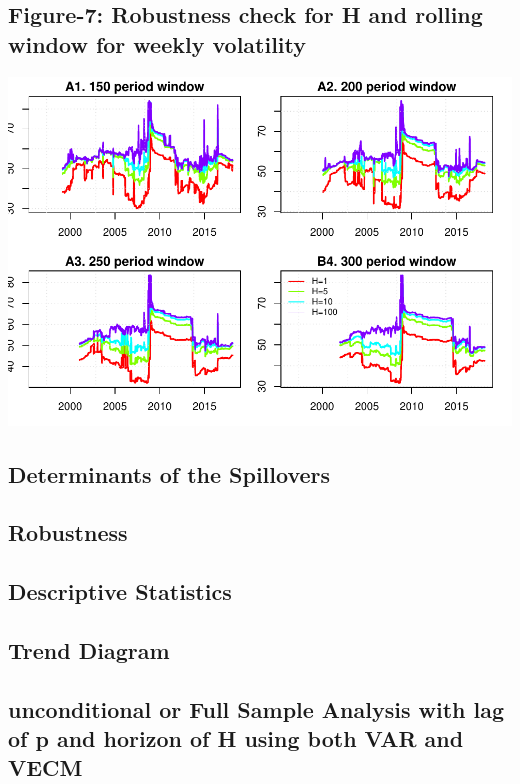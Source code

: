 \documentclass[]{elsarticle} %
\makeatletter
\def\maxwidth{\ifdim\Gin@nat@width>\linewidth\linewidth
\else\Gin@nat@width\fi}
\let\Oldincludegraphics\includegraphics
\renewcommand{\includegraphics}[1]{\Oldincludegraphics[width=\maxwidth]{#1}}
\makeatother
\begin{document}
\subsection{\texorpdfstring{\textbf{Figure-7: Robustness check for H and
rolling window for weekly
volatility}}{Figure-7: Robustness check for H and rolling window for weekly volatility}}\label{figure-7-robustness-check-for-h-and-rolling-window-for-weekly-volatility}

\includegraphics{Main_files/figure-latex/unnamed-chunk-11-1.pdf}

\subsection{Determinants of the
Spillovers}\label{determinants-of-the-spillovers}

\subsection{Robustness}\label{robustness}

\subsection{Descriptive Statistics}\label{descriptive-statistics}

\subsection{Trend Diagram}\label{trend-diagram}

\subsection{unconditional or Full Sample Analysis with lag of p and
horizon of H using both VAR and
VECM}\label{unconditional-or-full-sample-analysis-with-lag-of-p-and-horizon-of-h-using-both-var-and-vecm}
\end{document}
